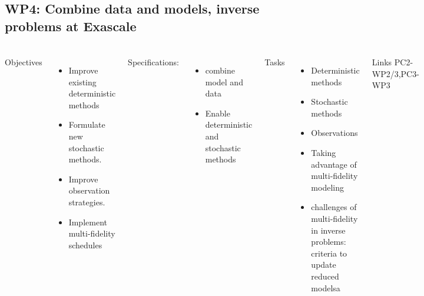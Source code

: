 \subsection{WP4: Combine data and models, inverse problems at Exascale }
\begin{frame}
  \frametitle{\insertsectionhead}
  \framesubtitle{\insertsubsectionhead}
  \begin{columns}[t]
    Objectives
    \begin{itemize}
      \item Improve existing deterministic methods 
      \item  Formulate new stochastic methods. 
      \item Improve observation strategies.
      \item Implement multi-fidelity schedules  
    \end{itemize}
    Specifications:
    \begin{itemize}
      \item combine model and data 
      \item Enable deterministic and stochastic methods
    \end{itemize}
    Tasks
    \begin{itemize}
      \item Deterministic methods
      \item Stochastic methods
      \item Observations
      \item Taking advantage of multi-fidelity modeling
      \item challenges of multi-fidelity in inverse problems: criteria to update reduced modelsa
    \end{itemize}
    \begin{alertblock}{Links}
    PC2-WP2/3,PC3-WP3
  \end{alertblock}
  \end{columns}
\end{frame}

